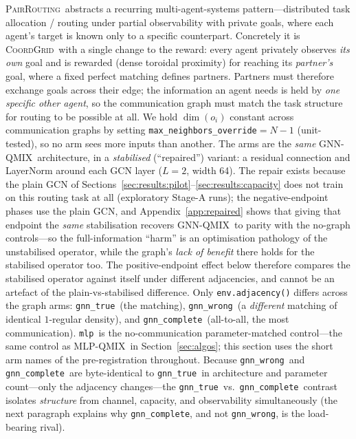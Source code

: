 \documentclass[10pt]{article}
\newcommand{\algoname}[1]{\textsc{#1}}
\newcommand{\gnnqmix}{\algoname{GNN-QMIX}}
\newcommand{\coordgrid}{\textsc{CoordGrid}}
\newcommand{\mlpqmix}{\algoname{MLP-QMIX}}
\newcommand{\gtrue}{\texttt{gnn\_true}}
\newcommand{\gwrong}{\texttt{gnn\_wrong}}
\newcommand{\gcomplete}{\texttt{gnn\_complete}}
\newcommand{\mlpc}{\texttt{mlp}}
\newcommand{\pairrouting}{\textsc{PairRouting}}
\begin{document}
\pairrouting\ abstracts a recurring multi-agent-systems pattern---distributed
task allocation / routing under partial observability with private goals, where
each agent's target is known only to a specific counterpart. Concretely it is
\coordgrid\ with a single change to the reward: every agent
privately observes \emph{its own} goal and is rewarded (dense toroidal
proximity) for reaching its \emph{partner's} goal, where a fixed perfect
matching defines partners. Partners must therefore exchange goals across
their edge; the information an agent needs is held by \emph{one specific
other agent}, so the communication graph must match the task structure for
routing to be possible at all. We hold $\dim(o_i)$ constant across
communication graphs by setting \texttt{max\_neighbors\_override}$=N{-}1$
(unit-tested), so no arm sees more inputs than another. The arms are the
\emph{same} \gnnqmix\ architecture, in a \emph{stabilised} (``repaired'')
variant: a residual connection and LayerNorm around each GCN layer
($L{=}2$, width 64). The repair exists because the plain GCN of
Sections~\ref{sec:results:pilot}--\ref{sec:results:capacity} does not train
on this routing task at all (exploratory Stage-A runs); the negative-endpoint
phases use the plain GCN, and Appendix~\ref{app:repaired} shows that giving
that endpoint the \emph{same} stabilisation recovers \gnnqmix\ to parity
with the no-graph controls---so the full-information ``harm'' is an
optimisation pathology of the unstabilised operator, while the graph's
\emph{lack of benefit} there holds for the stabilised operator too. The
positive-endpoint effect below therefore compares the stabilised operator
against itself under different adjacencies, and cannot be an artefact of the
plain-vs-stabilised difference.
Only \texttt{env.adjacency()} differs across the graph arms:
\gtrue\ (the matching), \gwrong\ (a \emph{different} matching of identical
$1$-regular density), and \gcomplete\ (all-to-all, the most communication).
\mlpc\ is the no-communication parameter-matched control---the same
control as \mlpqmix\ in Section~\ref{sec:algos}; this section uses the
short arm names of the pre-registration throughout. Because \gwrong\
and \gcomplete\ are byte-identical to \gtrue\ in architecture and parameter
count---only the adjacency changes---the \gtrue\ vs.\ \gcomplete\ contrast
isolates \emph{structure} from channel, capacity, and observability
simultaneously (the next paragraph explains why \gcomplete, and not \gwrong,
is the load-bearing rival).
\end{document}
